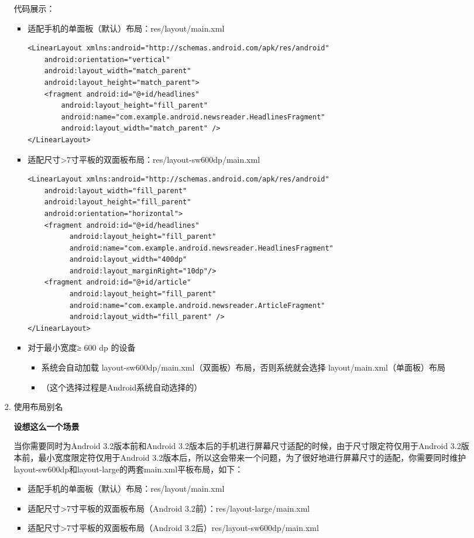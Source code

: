 \documentclass[9pt, b5paper]{article}
\begin{document}
\begin{enumerate}
\begin{enumerate}
\begin{enumerate}
代码展示：
\begin{itemize}
\item 适配手机的单面板（默认）布局：res/layout/main.xml
\begin{verbatim}
<LinearLayout xmlns:android="http://schemas.android.com/apk/res/android"
    android:orientation="vertical"
    android:layout_width="match_parent"
    android:layout_height="match_parent">
    <fragment android:id="@+id/headlines"
        android:layout_height="fill_parent"
        android:name="com.example.android.newsreader.HeadlinesFragment"
        android:layout_width="match_parent" />
</LinearLayout>
\end{verbatim}
\item 适配尺寸>7寸平板的双面板布局：res/layout-sw600dp/main.xml
\begin{verbatim}
<LinearLayout xmlns:android="http://schemas.android.com/apk/res/android"
    android:layout_width="fill_parent"
    android:layout_height="fill_parent"
    android:orientation="horizontal">
    <fragment android:id="@+id/headlines"
          android:layout_height="fill_parent"
          android:name="com.example.android.newsreader.HeadlinesFragment"
          android:layout_width="400dp"
          android:layout_marginRight="10dp"/>
    <fragment android:id="@+id/article"
          android:layout_height="fill_parent"
          android:name="com.example.android.newsreader.ArticleFragment"
          android:layout_width="fill_parent" />
</LinearLayout>
\end{verbatim}
\item 对于最小宽度≥ 600 dp 的设备
\begin{itemize}
\item 系统会自动加载 layout-sw600dp/main.xml（双面板）布局，否则系统就会选择 layout/main.xml（单面板）布局
\item （这个选择过程是Android系统自动选择的）
\end{itemize}
\end{itemize}
\item 使用布局别名
\label{sec-1-6-1-1-2-3}

\textbf{设想这么一个场景}

当你需要同时为Android 3.2版本前和Android 3.2版本后的手机进行屏幕尺寸适配的时候，由于尺寸限定符仅用于Android 3.2版本前，最小宽度限定符仅用于Android 3.2版本后，所以这会带来一个问题，为了很好地进行屏幕尺寸的适配，你需要同时维护layout-sw600dp和layout-large的两套main.xml平板布局，如下：
\begin{itemize}
\item 适配手机的单面板（默认）布局：res/layout/main.xml
\item 适配尺寸>7寸平板的双面板布局（Android 3.2前）：res/layout-large/main.xml
\item 适配尺寸>7寸平板的双面板布局（Android 3.2后）res/layout-sw600dp/main.xml
\end{itemize}


\end{enumerate}
\end{enumerate}
\end{enumerate}
\end{document}
